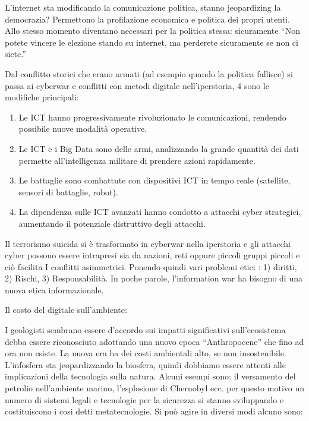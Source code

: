 \documentclass[]{article}
\begin{document}
L'internet sta modificando la comunicazione politica, stanno
jeopardizing la democrazia? Permettono la profilazione economica e
politica dei propri utenti. Allo stesso momento diventano necessari per
la politica stessa: sicuramente ``Non potete vincere le elezione stando
su internet, ma perderete sicuramente se non ci siete.''

Dal conflitto storici che erano armati (ad esempio quando la politica
fallisce) si passa ai cyberwar e conflitti con metodi digitale
nell'iperstoria, 4 sono le modifiche principali:

\begin{enumerate}
	\def\labelenumi{\arabic{enumi})}
	 
	\item
	Le ICT hanno progressivamente rivoluzionato le comunicazioni, rendendo
	possibile nuove modalità operative.
	\item
	Le ICT e i Big Data sono delle armi, analizzando la grande quantità
	dei dati permette all'intelligenza militare di prendere azioni
	rapidamente.
	\item
	Le battaglie sono combattute con dispositivi ICT in tempo reale
	(satellite, sensori di battaglie, robot).
	\item
	La dipendenza sulle ICT avanzati hanno condotto a attacchi cyber
	strategici, aumentando il potenziale distruttivo degli attacchi.
\end{enumerate}

Il terrorismo suicida si è trasformato in cyberwar nella iperstoria e
gli attacchi cyber possono essere intrapresi sia da nazioni, reti oppure
piccoli gruppi piccoli e ciò facilita I conflitti asimmetrici. Ponendo
quindi vari problemi etici : 1) diritti, 2) Rischi, 3) Responsabilità.
In poche parole, l'information war ha bisogno di una nuova etica
informazionale.

Il costo del digitale sull'ambiente:

I geologisti sembrano essere d'accordo sui impatti significativi
sull'ecosistema debba essere riconosciuto adottando una nuovo epoca
``Anthropocene'' che fino ad ora non esiste. La nuova era ha dei costi
ambientali alto, se non insostenibile. L'infosfera sta jeopardizzando la
biosfera, quindi dobbiamo essere attenti alle implicazioni della
tecnologia sulla natura. Alcuni esempi sono: il versamento del petrolio
nell'ambiente marino, l'esplosione di Chernobyl ecc. per questo motivo
un numero di sistemi legali e tecnologie per la sicurezza si stanno
sviluppando e costituiscono i cosi detti metatecnologie. Si può agire in
diversi modi alcuno sono:
\end{document}
